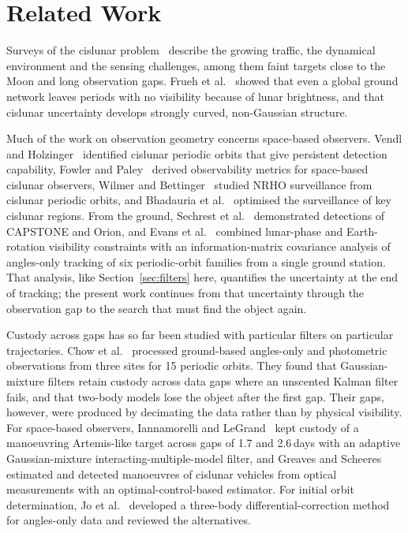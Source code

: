 \documentclass[pdflatex,sn-mathphys-num]{sn-jnl}
\begin{document}
\section{Related Work}\label{sec:related}

Surveys of the cislunar problem~\cite{holzinger2021primer,baker2024} describe the growing traffic,
the dynamical environment and the sensing challenges, among them faint targets close to the Moon and
long observation gaps. Frueh et al.~\cite{frueh2021} showed that even a global ground network leaves
periods with no visibility because of lunar brightness, and that cislunar uncertainty develops
strongly curved, non-Gaussian structure.

Much of the work on observation geometry concerns space-based observers. Vendl and
Holzinger~\cite{vendl2021} identified cislunar periodic orbits that give persistent detection
capability, Fowler and Paley~\cite{fowler2023} derived observability metrics for space-based cislunar
observers, Wilmer and Bettinger~\cite{wilmer2022} studied NRHO surveillance from cislunar periodic
orbits, and Bhadauria et al.~\cite{bhadauria2025} optimised the surveillance of key cislunar regions.
From the ground, Sechrest et al.~\cite{sechrest2024} demonstrated detections of CAPSTONE and Orion,
and Evans et al.~\cite{evans2025} combined lunar-phase and Earth-rotation visibility constraints with
an information-matrix covariance analysis of angles-only tracking of six periodic-orbit families from
a single ground station. That analysis, like Section~\ref{sec:filters} here, quantifies the
uncertainty at the end of tracking; the present work continues from that uncertainty through the
observation gap to the search that must find the object again.

Custody across gaps has so far been studied with particular filters on particular trajectories.
Chow et al.~\cite{chow2021,chow2022} processed ground-based angles-only and photometric observations
from three sites for 15 periodic orbits. They found that Gaussian-mixture filters retain custody
across data gaps where an unscented Kalman filter fails, and that two-body models lose the object
after the first gap. Their gaps, however, were produced by decimating the data rather than by physical
visibility. For space-based observers, Iannamorelli and LeGrand~\cite{iannamorelli2023,iannamorelli2025}
kept custody of a manoeuvring Artemis-like target across gaps of 1.7 and 2.6\,days with an adaptive
Gaussian-mixture interacting-multiple-model filter, and Greaves and Scheeres~\cite{greaves2021}
estimated and detected manoeuvres of cislunar vehicles from optical measurements with an
optimal-control-based estimator. For initial orbit determination, Jo et al.~\cite{jo2026} developed a
three-body differential-correction method for angles-only data and reviewed the alternatives.
\end{document}
